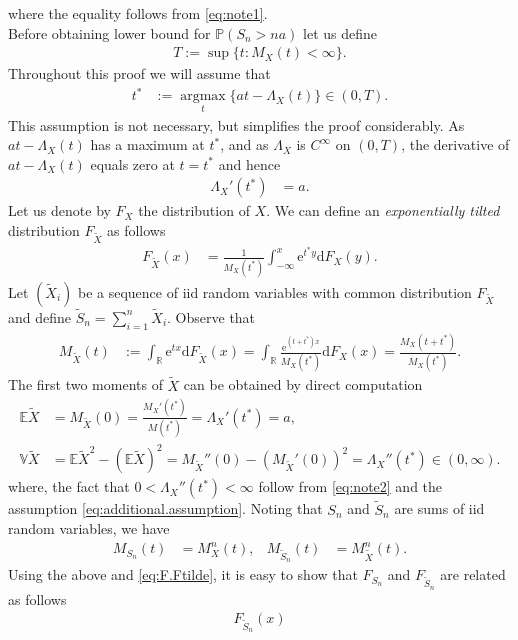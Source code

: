 \documentclass[12pt]{book}
\numberwithin{equation}{chapter}
\theoremstyle{plain}
\numberwithin{theorem}{section}
\theoremstyle{definition}
\numberwithin{exercise}{chapter}
\let\oldendproof\endproof
\renewenvironment{proof}[1][\proofname]{%
  \oldproof[\scshape\underline{#1}]%
}{\oldendproof}
\newcommand{\<}{\langle}
\renewcommand{\>}{\rangle}
\renewcommand{\(}{\left(}
\renewcommand{\)}{\right)}
\renewcommand{\[}{\left[}
\renewcommand{\]}{\right]}
\newcommand\Eb{\mathds{E}}
\newcommand\Pb{\mathds{P}}
\newcommand\Rb{\mathds{R}}
\newcommand\Vb{\mathds{V}}
\newcommand\Lam{\Lambda}
\newcommand\Xt{\widetilde{X}}
\newcommand\St{\widetilde{S}}
\newcommand\dd{\mathrm{d}}
\newcommand\ee{\mathrm{e}}
\begin{document}
\begin{proof}[Proof of Theorem \ref{thm:ldp}]
where the equality follows from \eqref{eq:note1}.
\\[0.5em]
Before obtaining lower bound for $\Pb( S_n > na )$ let us define
\begin{align}
T
	:= \sup \{ t : M_X(t) < \infty \} .
\end{align}
Throughout this proof we will assume that 
\begin{align}
t^*
	&:=	\operatorname*{arg max}_{t} \{ a t - \Lam_X(t) \}
	\in (0,T) . \label{eq:additional.assumption}
\end{align}
This assumption is not necessary, but simplifies the proof considerably.
As $a t - \Lam_X(t)$ has a maximum at $t^*$, and as $\Lam_X$ is $C^\infty$ on $(0,T)$, the derivative of $a t - \Lam_X(t)$ equals zero at $t = t^*$ and hence
\begin{align}
\Lam_X'(t^*)
	&=	a .
\end{align}
Let us denote by $F_X$ the distribution of $X$.  We can define an \emph{exponentially tilted} distribution $F_{\Xt}$ as follows
\begin{align}
F_{\Xt}(x)
	&=	\frac{1}{M_X(t^*)} \int_{-\infty}^x \ee^{t^* y} \dd F_X(y) . \label{eq:F.Ftilde}
\end{align}
Let $(\Xt_i)$ be a sequence of iid random variables with common distribution $F_{\Xt}$ and define $\St_n = \sum_{i=1}^n \Xt_i$.  Observe that
\begin{align}
M_{\Xt}(t)
	&:= \int_\Rb  \ee^{t x} \dd F_{\Xt}(x) 
	= 	\int_\Rb \frac{\ee^{(t+t^*) x}}{M_X(t^*)} \dd F_X(x)
	=		\frac{M_X(t + t^*)}{M_X(t^*)} . 
\end{align}
The first two moments of $\Xt$ can be obtained by direct computation
\begin{align}
\Eb \Xt 
	&=	M_{\Xt} (0) 
	=		\frac{M_X'(t^*)}{M(t^*)} 
	=		\Lam_X'(t^*) = a  , \\
\Vb \Xt
	&=	\Eb \Xt^2 - (\Eb \Xt)^2 
	=		M_{\Xt}''(0) - ( M_{\Xt}'(0) )^2
	=		\Lam_X''(t^*) \in (0,\infty) .
\end{align}
where, the fact that $0 < \Lam_X''(t^*) < \infty$ follow from \eqref{eq:note2} and the assumption \eqref{eq:additional.assumption}.
Noting that $S_n$ and $\St_n$ are sums of iid random variables, we have
\begin{align}
M_{S_n}(t)
	&=	M_X^n(t) , &
M_{\St_n}(t)
	&=	M_{\Xt}^n(t) .
\end{align}
Using the above and \eqref{eq:F.Ftilde}, it is easy to show that $F_{S_n}$ and $F_{\St_n}$ are related as follows
\begin{align}
F_{\St_n}(x)

\end{align}
\end{proof}
\end{document}
